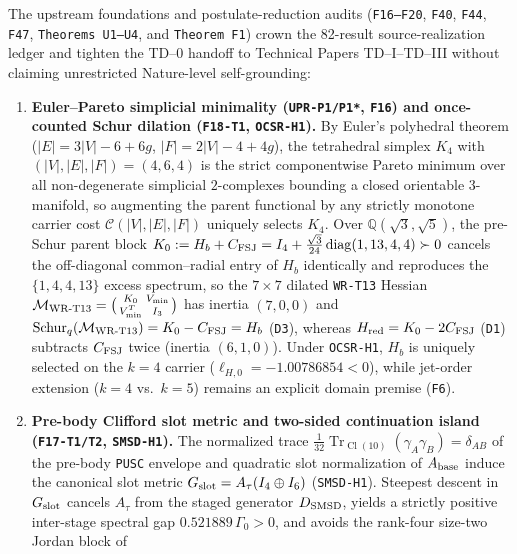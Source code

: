 \documentclass[11pt,a4paper]{article}
\theoremstyle{remark}
\begin{document}
The upstream foundations and postulate-reduction audits (\texttt{F16--F20},
\texttt{F40}, \texttt{F44}, \texttt{F47}, \texttt{Theorems U1--U4}, and
\texttt{Theorem F1}) crown the 82-result source-realization ledger and tighten
the TD--0 handoff to Technical Papers TD--I--TD--III without claiming
unrestricted Nature-level self-grounding:
\begin{enumerate}
\item \textbf{Euler--Pareto simplicial minimality (\texttt{UPR-P1/P1*}, \texttt{F16}) and once-counted Schur dilation (\texttt{F18-T1}, \texttt{OCSR-H1}).}
By Euler's polyhedral theorem ($|E|=3|V|-6+6g$, $|F|=2|V|-4+4g$), the tetrahedral
simplex $K_4$ with $(|V|,|E|,|F|)=(4,6,4)$ is the strict componentwise Pareto
minimum over all non-degenerate simplicial $2$-complexes bounding a closed
orientable $3$-manifold, so augmenting the parent functional by any strictly
monotone carrier cost $\mathcal{C}(|V|,|E|,|F|)$ uniquely selects $K_4$.
Over $\mathbb{Q}(\sqrt{3},\sqrt{5})$, the pre-Schur parent block
$K_0:=H_b+C_{\rm FSJ}=I_4+\frac{\sqrt{3}}{24}\operatorname{diag}(1,13,4,4)\succ 0$
cancels the off-diagonal common--radial entry of $H_b$ identically and reproduces
the $\{1,4,4,13\}$ excess spectrum, so the $7\times 7$ dilated \texttt{WR-T13}
Hessian $\mathcal M_{\rm WR\text{-}T13}=\bigl(\begin{smallmatrix}K_0&V_{\min}\\V_{\min}^T&I_3\end{smallmatrix}\bigr)$
has inertia $(7,0,0)$ and $\operatorname{Schur}_q(\mathcal M_{\rm WR\text{-}T13})=K_0-C_{\rm FSJ}=H_b$
(\texttt{D3}), whereas $H_{\rm red}=K_0-2C_{\rm FSJ}$ (\texttt{D1}) subtracts
$C_{\rm FSJ}$ twice (inertia $(6,1,0)$). Under \texttt{OCSR-H1}, $H_b$ is uniquely
selected on the $k=4$ carrier ($\ell_{H,0}=-1.00786854<0$), while jet-order
extension ($k=4$ vs.\ $k=5$) remains an explicit domain premise (\texttt{F6}).
\item \textbf{Pre-body Clifford slot metric and two-sided continuation island (\texttt{F17-T1/T2}, \texttt{SMSD-H1}).}
The normalized trace $\frac{1}{32}\operatorname{Tr}_{\operatorname{Cl}(10)}(\gamma_A\gamma_B)=\delta_{AB}$
of the pre-body \texttt{PUSC} envelope and quadratic slot normalization of
$A_{\rm base}$ induce the canonical slot metric $G_{\rm slot}=A_\tau(I_4\oplus I_6)$
(\texttt{SMSD-H1}). Steepest descent in $G_{\rm slot}$ cancels $A_\tau$ from the
staged generator $D_{\rm SMSD}$, yields a strictly positive inter-stage spectral
gap $0.521889\,\Gamma_0>0$, and avoids the rank-four size-two Jordan block of

\end{enumerate}
\end{document}

